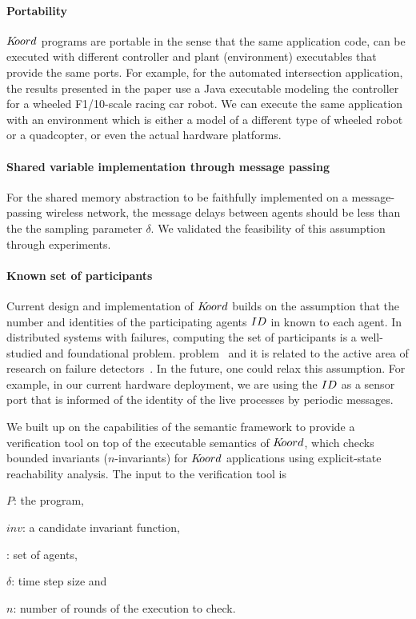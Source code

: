 \paragraph*{Portability}
$K\kern-2pt oord$ programs are portable in the sense that the same application code, can be executed with different controller and plant (environment) executables that provide the same ports. For example, for the automated intersection application, the results presented in the paper use a Java executable modeling the controller for a wheeled F1/10-scale racing car robot. We can execute the same application with an environment which is either a model of a different type of wheeled robot or a quadcopter, or even the actual hardware platforms. 

\paragraph*{Shared variable implementation through message passing}
For the shared memory abstraction to be faithfully implemented on a message-passing wireless network, the message delays between agents should be less than the the sampling parameter $\delta$. We validated the feasibility of this assumption through experiments.

\paragraph*{Known set of participants}
Current design and implementation of $K\kern-2pt oord$ builds on the assumption that the number and identities of the participating agents $ID$ in known to each agent. In distributed systems with failures, computing the set of participants is a well-studied and foundational problem. problem~\cite{AlistarhAGG2011} and it is related to the active area of research on failure detectors~\cite{Chandra:1996,delporte2004weakest}. In the future, one could  relax this  assumption. For example, in our current hardware deployment, we are using the $ID$ as a sensor port that is informed of the identity of the live processes by periodic messages. 


We built up on the capabilities of the \K semantic framework to provide a verification tool on top of the executable semantics of $K\kern-2pt oord$, which checks bounded invariants ($n$-invariants) for $K\kern-2pt oord$ applications using explicit-state reachability analysis. The input to the verification tool is 
\begin{inparaenum}[(i)] 
    \item $P$: the program, 
    \item $\mathit{inv}$: a candidate invariant function, 
    \item {\UINS}: set of agents, 
    \item $\delta$: time step size and 
    \item $n$: number of rounds of the execution to check.
\end{inparaenum}


